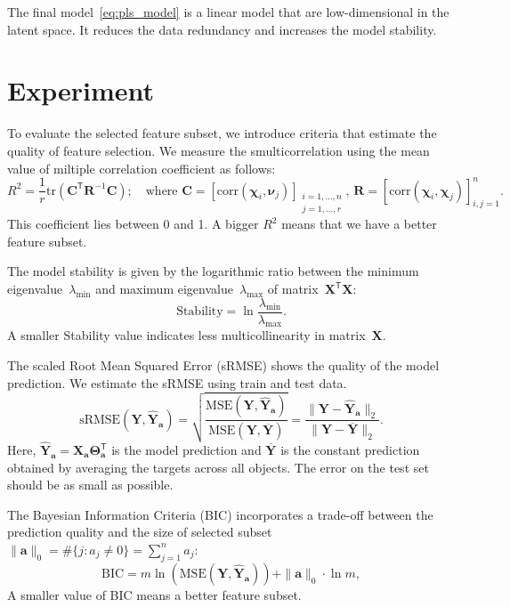 \documentclass[12pt,twoside]{article}
\theoremstyle{definition}
\newcommand{\ba}{\mathbf{a}}
\newcommand{\bY}{\mathbf{Y}}
\newcommand{\bX}{\mathbf{X}}
\newcommand{\bC}{\mathbf{C}}
\newcommand{\T}{\mathsf{T}}
\newcommand{\bchi}{\boldsymbol{\chi}}
\newcommand{\bnu}{\boldsymbol{\nu}}
\newcommand{\bTheta}{\boldsymbol{\Theta}}
\begin{document}
The final model~\eqref{eq:pls_model} is a linear model that are low-dimensional in the latent space. 
It reduces the data redundancy and increases the model stability. 

\section{Experiment}

To evaluate the selected feature subset, we introduce criteria that estimate the quality of feature selection.
We measure the smulticorrelation using the mean value of miltiple correlation coefficient as follows:
\begin{equation*}
R^2 = \frac{1}{r} \text{tr} \left( \bC^{\T} \mathbf{R}^{-1} \bC \right); \quad \text{where }\bC = [ \text{corr}(\bchi_i, \bnu_j)]_{\substack{i=1, \dots, n \\ j=1, \dots, r}}, \, \mathbf{R} = [ \text{corr}(\bchi_i, \bchi_j)]_{i, j = 1}^n.
\end{equation*}
This coefficient lies between 0 and 1. A bigger $R^2$ means that we have a better feature subset.

The model stability is given by the logarithmic ratio between the minimum eigenvalue~$\lambda_{\min}$ and maximum eigenvalue~$\lambda_{\max}$ of matrix~$\bX^{\T} \bX$:
\begin{equation*}
\text{Stability} = \ln \frac{\lambda_{\min}}{\lambda_{\max}}.
\end{equation*}
A smaller Stability value indicates less multicollinearity in matrix~$\bX$.

The scaled Root Mean Squared Error (sRMSE) shows the quality of the model prediction. We estimate the sRMSE using train and test data.
\begin{equation*}
\text{sRMSE}(\bY, \widehat{\bY}_{\ba}) = \sqrt{\frac{\text{MSE} (\bY, \widehat{\bY}_{\ba})}{\text{MSE} (\bY, \overline{\bY})}} =  \frac{\| \bY - \widehat{\bY}_{\ba} \|_2}{\| \bY - \overline{\bY} \|_2}.
\end{equation*}
Here, $\widehat{\bY}_{\ba} = \bX_{\ba} \bTheta_{\ba}^{\T}$ is the model prediction and $\overline{\bY}$ is the constant prediction obtained by averaging the targets across all objects.
The error on the test set should be as small as possible.

The Bayesian Information Criteria (BIC) incorporates a trade-off between the prediction quality and the size of selected subset~$\|\ba\|_0 = \#\{j: a_j \neq 0\}= \sum_{j=1}^n a_j$:
\begin{equation*}
\text{BIC} = m \ln \left( \text{MSE} ( \bY, \widehat{\bY}_{\ba})\right) + \| \ba \|_0 \cdot \ln m,
\end{equation*}
A smaller value of BIC means a better feature subset.
\end{document}
